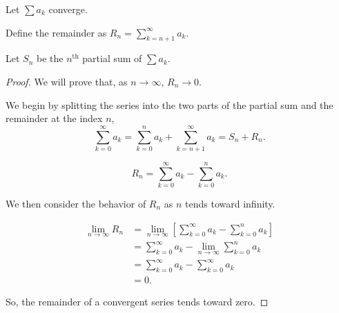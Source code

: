 \documentclass[../hw2]{subfiles}
\begin{document}
Let $\sum a_k$ converge.

Define the remainder as $R_n=\sum_{k=n+1}^{\infty}a_k$.

Let $S_n$ be the $n^{\text{th}}$ partial sum of $\sum a_k$.

\begin{proof}
We will prove that, as $n\to\infty$, $R_n\to0$.

We begin by splitting the series into the two parts of the partial sum and the remainder at the index $n$, \[\sum_{k=0}^{\infty}a_k=\sum_{k=0}^{n}a_k+\sum_{k=n+1}^{\infty}a_k=S_n+R_n.\]

\[R_n=\sum_{k=0}^{\infty} a_k - \sum_{k=0}^{n} a_k.\]

We then consider the behavior of $R_n$ as $n$ tends toward infinity.

\begin{align*}
    \lim\limits_{n\to\infty}R_n&=\lim\limits_{n\to\infty}\left[\sum_{k=0}^{\infty} a_k - \sum_{k=0}^{n} a_k\right] \\
    &= \sum_{k=0}^{\infty} a_k -\lim\limits_{n\to\infty}\sum_{k=0}^{n} a_k \\
    &= \sum_{k=0}^{\infty} a_k - \sum_{k=0}^{\infty} a_k \\
    &= 0.
\end{align*}

So, the remainder of a convergent series tends toward zero.
\end{proof}
\end{document}
